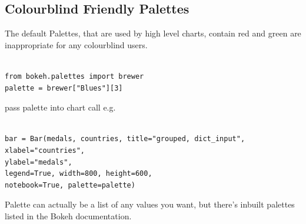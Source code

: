 \documentclass[a4paper,12pt]{article}
\begin{document}

\subsection*{Colourblind Friendly Palettes} The default Palettes, that are used by high level charts,  contain red and green are inappropriate for any colourblind users.
{
	\large
	\begin{framed}
		\begin{verbatim}
		
from bokeh.palettes import brewer
palette = brewer["Blues"][3]
\end{verbatim}
\end{framed}
}
pass palette into chart call e.g.

{
	\large
	\begin{framed}
		\begin{verbatim}
		
bar = Bar(medals, countries, title="grouped, dict_input", 
xlabel="countries", 
ylabel="medals", 
legend=True, width=800, height=600, 
notebook=True, palette=palette)
\end{verbatim}
\end{framed}
}
\noindent Palette can actually be a list of any values you want, but there's inbuilt palettes listed in the Bokeh documentation. %
\end{document}
